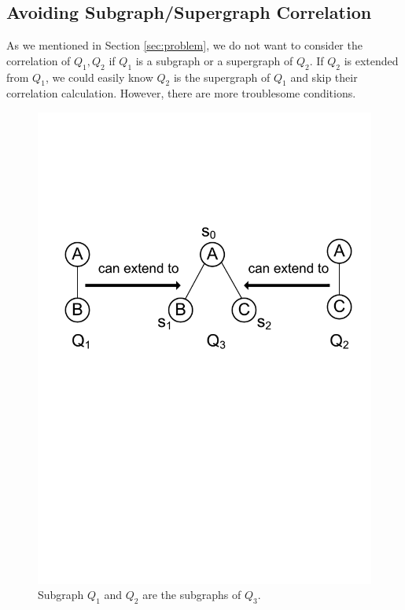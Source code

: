 \subsection{Avoiding Subgraph/Supergraph Correlation}\label{subsec:avoiding}
As we mentioned in Section \ref{sec:problem}, we do not want to consider the correlation of $Q_1,Q_2$ if $Q_1$ is a subgraph or a supergraph of $Q_2$. If $Q_2$ is extended from $Q_1$, we could easily know $Q_2$ is the supergraph of $Q_1$ and skip their correlation calculation. However, there are more troublesome conditions.


\begin{figure}[t!]
	\centering
	\includegraphics[scale=0.32]{images/avoiding}
	\vspace{-2mm}
	\caption{\scriptsize Subgraph $Q_1$ and $Q_2$ are the subgraphs of $Q_3$.}
	\label{fig:avoiding}
	\vspace{-4mm}
\end{figure}

